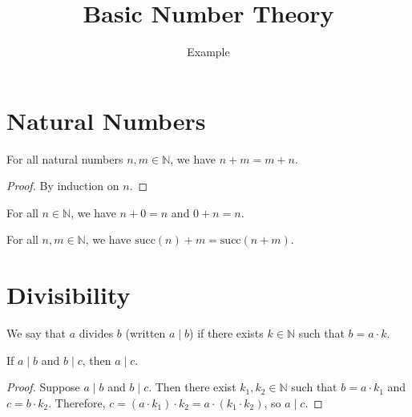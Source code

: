 \documentclass{article}
\title{Basic Number Theory}
\author{Example}
\date{}
\begin{document}
\maketitle

\section{Natural Numbers}

\begin{theorem}
For all natural numbers $n, m \in \mathbb{N}$, we have $n + m = m + n$.
\end{theorem}

\begin{proof}
By induction on $n$.
\end{proof}

\begin{theorem}
For all $n \in \mathbb{N}$, we have $n + 0 = n$ and $0 + n = n$.
\end{theorem}

\begin{lemma}
For all $n, m \in \mathbb{N}$, we have $\text{succ}(n) + m = \text{succ}(n + m)$.
\end{lemma}

\section{Divisibility}

\begin{definition}
We say that $a$ divides $b$ (written $a \mid b$) if there exists $k \in \mathbb{N}$ such that $b = a \cdot k$.
\end{definition}

\begin{theorem}
If $a \mid b$ and $b \mid c$, then $a \mid c$.
\end{theorem}

\begin{proof}
Suppose $a \mid b$ and $b \mid c$. Then there exist $k_1, k_2 \in \mathbb{N}$ such that $b = a \cdot k_1$ and $c = b \cdot k_2$. 
Therefore, $c = (a \cdot k_1) \cdot k_2 = a \cdot (k_1 \cdot k_2)$, so $a \mid c$.
\end{proof}
\end{document}
